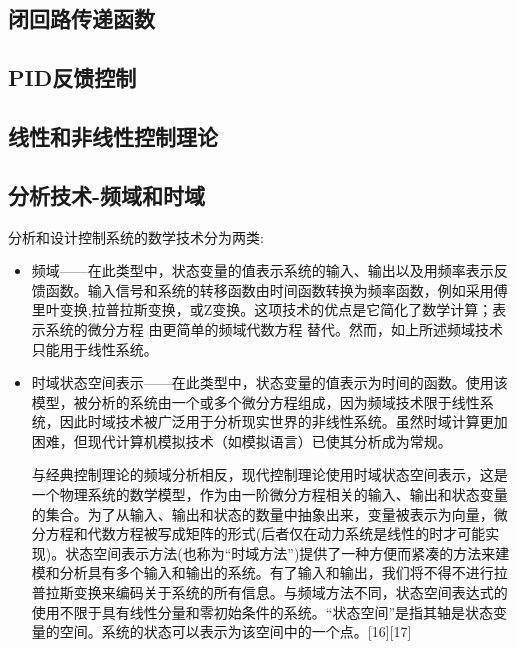 \subsection{闭回路传递函数}



\subsection{PID反馈控制}



\subsection{线性和非线性控制理论}



\subsection{分析技术-频域和时域}

分析和设计控制系统的数学技术分为两类:

\begin{itemize}
\item 频域——在此类型中，状态变量的值表示系统的输入、输出以及用频率表示反馈函数。输入信号和系统的转移函数由时间函数转换为频率函数，例如采用傅里叶变换,拉普拉斯变换，或Z变换。这项技术的优点是它简化了数学计算；表示系统的微分方程 由更简单的频域代数方程 替代。然而，如上所述频域技术只能用于线性系统。
\item 时域状态空间表示——在此类型中，状态变量的值表示为时间的函数。使用该模型，被分析的系统由一个或多个微分方程组成，因为频域技术限于线性系统，因此时域技术被广泛用于分析现实世界的非线性系统。虽然时域计算更加困难，但现代计算机模拟技术（如模拟语言）已使其分析成为常规。

与经典控制理论的频域分析相反，现代控制理论使用时域状态空间表示，这是一个物理系统的数学模型，作为由一阶微分方程相关的输入、输出和状态变量的集合。为了从输入、输出和状态的数量中抽象出来，变量被表示为向量，微分方程和代数方程被写成矩阵的形式(后者仅在动力系统是线性的时才可能实现)。状态空间表示方法(也称为“时域方法”)提供了一种方便而紧凑的方法来建模和分析具有多个输入和输出的系统。有了输入和输出，我们将不得不进行拉普拉斯变换来编码关于系统的所有信息。与频域方法不同，状态空间表达式的使用不限于具有线性分量和零初始条件的系统。“状态空间”是指其轴是状态变量的空间。系统的状态可以表示为该空间中的一个点。[16][17]

\end{itemize}


